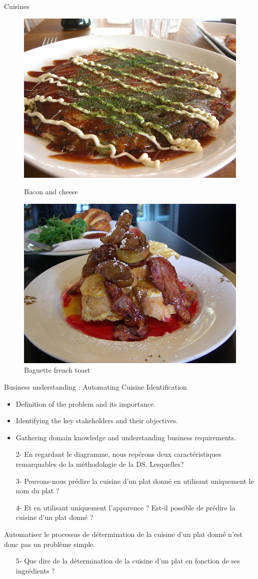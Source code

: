 \documentclass{beamer}
\begin{document}
\begin{frame}{Cuisines}
\begin{figure}[h]
		\begin{minipage}{0.45\textwidth}
			\centering
			\includegraphics[width=0.5\linewidth]{photo3.jpg}
			\caption{Bacon and cheese}
		\end{minipage}\hfill
		\begin{minipage}{0.45\textwidth}
			\centering
			\includegraphics[width=0.5\linewidth]{photo4.jpg}
			\caption{Baguette french toast}
		\end{minipage}
	\end{figure}
	
\end{frame}	


\begin{frame}{Business understanding : Automating Cuisine Identification} 
		\begin{itemize}
	\item Definition of the problem and its importance.
	\item Identifying the key stakeholders and their objectives.
	\item Gathering domain knowledge and understanding business requirements.
\end{itemize}
\begin{enumerate}
	\item[2-] En regardant le diagramme, nous repérons  deux caractéristiques remarquables de la méthodologie de la DS. Lesquelles?
	\item[3-] Pouvons-nous prédire la cuisine d'un plat donné en utilisant uniquement le nom du plat ?
	\item[4-] Et en utilisant uniquement l'apparence ? Est-il possible de prédire la cuisine d'un plat donné ?
\end{enumerate}
Automatiser le processus de détermination de la cuisine d'un plat donné n'est donc pas un problème simple.

\begin{itemize}
	\item[5-] Que dire de la détermination de la cuisine d'un plat en fonction de ses ingrédients ?
\end{itemize}
\end{frame}
\end{document}
